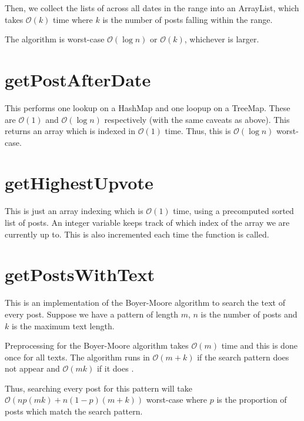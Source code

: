 \documentclass[11pt,a4paper]{article} %
\begin{document}
Then, we collect the lists of across all dates in the range into an ArrayList, which takes 
$\mathcal O(k)$ time where $k$ is the number of posts falling within the range.

The algorithm is worst-case $\mathcal O(\log n)$ or $\mathcal O(k)$, whichever is larger.


\section*{getPostAfterDate}
This performs one lookup on a HashMap and one loopup on a TreeMap. 
These are $\mathcal O(1)$ and $\mathcal O(\log n)$ respectively
(with the same caveats as above). This returns an array
which is indexed in $\mathcal O(1)$ time.
Thus, this is $\mathcal O(\log n)$ worst-case.

\section*{getHighestUpvote}
This is just an array indexing which is  $\mathcal O(1)$ time,
using a precomputed sorted list of posts. An integer variable keeps track of 
which index of the array we are currently up to. This is also incremented each time 
the function is called.

\section*{getPostsWithText}
This is an implementation of the Boyer-Moore algorithm to search 
the text of every post. Suppose we have a pattern of length $m$,
 $n$ is the number of posts and $k$ is the maximum text length.

Preprocessing for the Boyer-Moore algorithm takes $\mathcal O(m)$ time
and this is done once for all texts.
The algorithm runs in $\mathcal O(m + k)$ if the 
search pattern does not appear and $\mathcal O(mk)$ if it does \cite{sustik}. 

Thus, searching every post for this pattern will take $\mathcal O(np(mk) + n(1-p)(m+k))$
worst-case where $p$ is the proportion of posts which match the search pattern.
 
 



\end{document}
